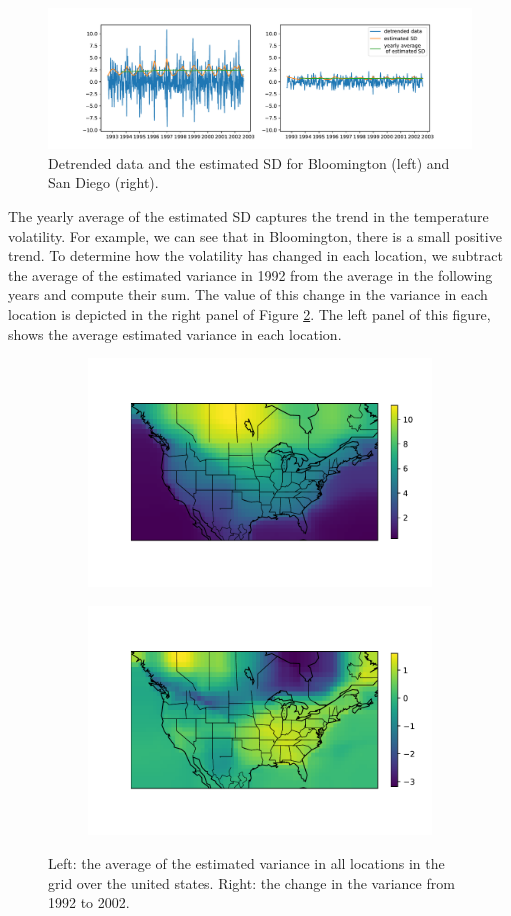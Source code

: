 \documentclass[review]{elsarticle}
\begin{document}
\begin{figure}[ht]
	\vskip 0.2in
	\begin{center}
		\centerline{\includegraphics[width=1\columnwidth]{Figures/estimatedSD}}
		\caption{Detrended data and the estimated SD for Bloomington (left) and San Diego (right).}
		\label{fig:estimatedSD}
	\end{center}
	\vskip -0.2in
\end{figure}

The yearly average of the estimated SD captures the trend in the temperature volatility. For example, we can see that in Bloomington, there is a small positive trend. To determine how the volatility has changed in each location, we subtract the average of the estimated variance in 1992 from the average in the following years and compute their sum. The value of this change in the variance in each location is depicted in the right panel of Figure \ref{fig:avg_change_estimatedSD}. The left panel of this figure, shows the average estimated variance in each location.

\begin{figure}[ht]
	\begin{subfigure}
	  \centering
	  \includegraphics[width=.5\linewidth]{Figures/avg_estimatedVar}
	\end{subfigure}%
	\begin{subfigure}
	  \centering
	  \includegraphics[width=.5\linewidth]{Figures/avg_change_estimatedVar}
	\end{subfigure}%
	\caption{Left: the average of the estimated variance in all locations in the grid over the united states. Right: the change in the variance from 1992 to 2002.}
	\label{fig:avg_change_estimatedSD}
\end{figure} 
\end{document}
